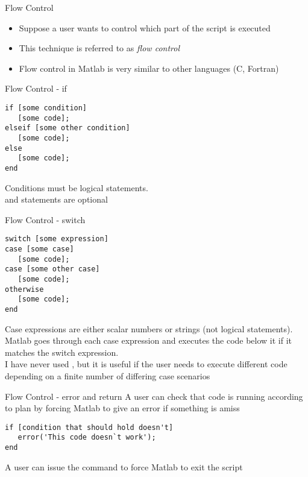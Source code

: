 \documentclass[english,xcolor=dvipsnames]{beamer}
\begin{document}
\begin{frame}[fragile]{Flow Control}
\begin{itemize}
	\item Suppose a user wants to control which part of the script is executed
	\item This technique is referred to as \emph{flow control}
	\item Flow control in Matlab is very similar to other languages (C, Fortran)
\end{itemize}
\end{frame}

\begin{frame}[fragile]{Flow Control - if}
\begin{lstlisting}
if [some condition]
   [some code];
elseif [some other condition]
   [some code];
else
   [some code];
end
\end{lstlisting}
Conditions must be logical statements.\\
 and  statements are optional
\end{frame}

\begin{frame}[fragile]{Flow Control - switch}
\begin{lstlisting}
switch [some expression]
case [some case]
   [some code];
case [some other case]
   [some code];
otherwise
   [some code];
end
\end{lstlisting}
Case expressions are either scalar numbers or strings (not logical statements).\\
Matlab goes through each case expression and executes the code below it if it matches the switch expression.\\
I have never used , but it is useful if the user needs to execute different code depending on a finite number of differing case scenarios
\end{frame}

\begin{frame}[fragile]{Flow Control - error and return}
A user can check that code is running according to plan by forcing Matlab to give an error if something is amiss
\begin{lstlisting}
if [condition that should hold doesn't]
   error('This code doesn`t work');
end
\end{lstlisting}
A user can issue the  command to force Matlab to exit the script
\end{frame}
\end{document}
